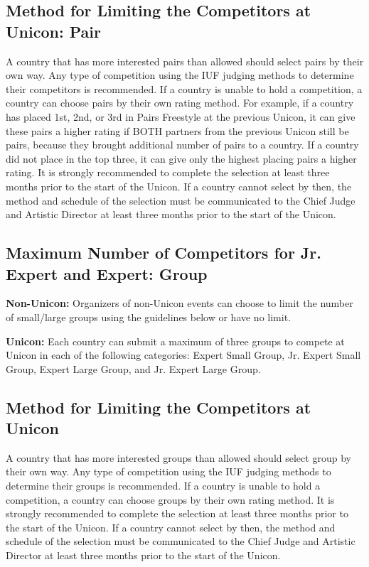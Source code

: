 \subsection{Method for Limiting the Competitors at Unicon: Pair}
A country that has more interested pairs than allowed should select pairs by their own way.
Any type of competition using the IUF judging methods to determine their competitors is recommended.
If a country is unable to hold a competition, a country can choose pairs by their own rating method.
For example, if a country has placed 1st, 2nd, or 3rd in Pairs Freestyle at the previous Unicon, it can give these pairs a higher rating if BOTH partners from the previous Unicon still be pairs, because they brought additional number of pairs to a country.
If a country did not place in the top three, it can give only the highest placing pairs a higher rating.
It is strongly recommended to complete the selection at least three months prior to the start of the Unicon.
If a country cannot select by then, the method and schedule of the selection must be communicated to the Chief Judge and Artistic Director at least three months prior to the start of the Unicon.

\subsection{Maximum Number of Competitors for Jr. Expert and Expert: Group}
\textbf{Non-Unicon:} Organizers of non-Unicon events can choose to limit the number of small/large groups using the guidelines below or have no limit.

\textbf{Unicon:} Each country can submit a maximum of three groups to compete at Unicon in each of the following categories: Expert Small Group, Jr. Expert Small Group, Expert Large Group, and Jr. Expert Large Group.

\subsection{Method for Limiting the Competitors at Unicon}
A country that has more interested groups than allowed should select group by their own way.
Any type of competition using the IUF judging methods to determine their groups is recommended.
If a country is unable to hold a competition, a country can choose groups by their own rating method.
It is strongly recommended to complete the selection at least three months prior to the start of the Unicon.
If a country cannot select by then, the method and schedule of the selection must be communicated to the Chief Judge and Artistic Director at least three months prior to the start of the Unicon.
